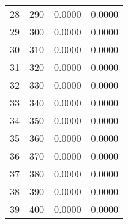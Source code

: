 \begin{table}
\begin{adjustbox}{width=1\textwidth/2}
\begin{tabular}{|c|c|c|c|}
\cline{1-4}
28 & 290 & 0.0000 & 0.0000 \\
\cline{1-4}
29 & 300 & 0.0000 & 0.0000 \\
\cline{1-4}
30 & 310 & 0.0000 & 0.0000 \\
\cline{1-4}
31 & 320 & 0.0000 & 0.0000 \\
\cline{1-4}
32 & 330 & 0.0000 & 0.0000 \\
\cline{1-4}
33 & 340 & 0.0000 & 0.0000 \\
\cline{1-4}
34 & 350 & 0.0000 & 0.0000 \\
\cline{1-4}
35 & 360 & 0.0000 & 0.0000 \\
\cline{1-4}
36 & 370 & 0.0000 & 0.0000 \\
\cline{1-4}
37 & 380 & 0.0000 & 0.0000 \\
\cline{1-4}
38 & 390 & 0.0000 & 0.0000 \\
\cline{1-4}
39 & 400 & 0.0000 & 0.0000 \\
\cline{1-4}
\end{tabular}
\end{adjustbox}
\end{table}

